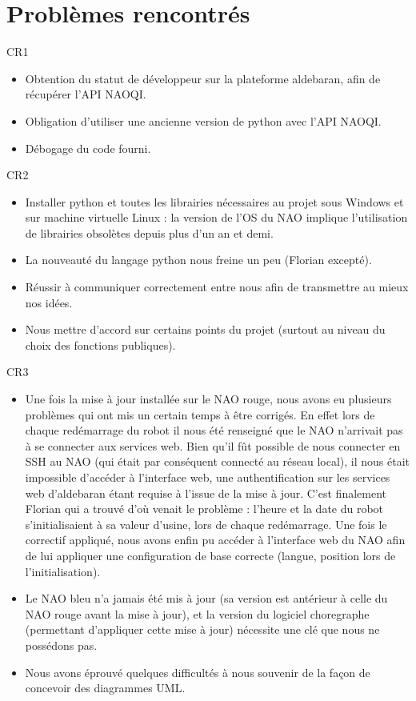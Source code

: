 \section{Problèmes rencontrés}
\label{sec:Problèmes rencontrés}

  \par CR1
  \begin{itemize}
    \item Obtention du statut de développeur sur la plateforme aldebaran, afin de récupérer l’API NAOQI.
    \item Obligation d’utiliser une ancienne version de python avec l’API NAOQI.
    \item Débogage du code fourni.\\
  \end{itemize}

  \par CR2
  \begin{itemize}
    \item Installer python et toutes les librairies nécessaires au projet sous Windows et sur machine virtuelle Linux : la version de l’OS du NAO implique l’utilisation de librairies obsolètes depuis plus d’un an et demi.
    \item La nouveauté du langage python nous freine un peu (Florian excepté).
    \item Réussir à communiquer correctement entre nous afin de transmettre au mieux nos idées.
    \item Nous mettre d’accord sur certains points du projet (surtout au niveau du choix des fonctions publiques).\\
  \end{itemize}

  \par CR3
  \begin{itemize}
    \item Une fois la mise à jour installée sur le NAO rouge, nous avons eu plusieurs problèmes qui ont mis un certain temps à être corrigés.
    En effet lors de chaque redémarrage du robot il nous été renseigné que le NAO n’arrivait pas à se connecter aux services web.
    Bien qu’il fût possible de nous connecter en SSH au NAO (qui était par conséquent connecté au réseau local),
    il nous était impossible d’accéder à l’interface web, une authentification sur les services web d’aldebaran étant requise à l’issue de la mise à jour.
    C’est finalement Florian qui a trouvé d’où venait le problème : l’heure et la date du robot s’initialisaient à sa valeur d’usine, lors de chaque redémarrage.
    Une fois le correctif appliqué, nous avons enfin pu accéder à l’interface web du NAO afin de
    lui appliquer une configuration de base correcte (langue, position lors de l’initialisation).
    \item Le NAO bleu n’a jamais été mis à jour (sa version est antérieur à celle du NAO rouge avant la mise à jour),
    et la version du logiciel choregraphe (permettant d’appliquer cette mise à jour) nécessite une clé que nous ne possédons pas.
    \item Nous avons éprouvé quelques difficultés à nous souvenir de la façon de concevoir des diagrammes UML.\\
  \end{itemize}

